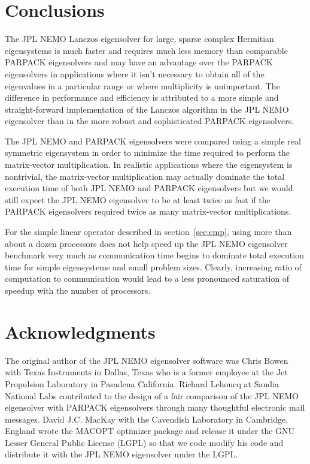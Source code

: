 \documentclass[twoside,12pt]{article}
\begin{document}
\section{Conclusions}
The JPL NEMO Lanczos eigensolver
for large, sparse complex Hermitian eigensystems
is much faster and requires much less memory
than comparable PARPACK eigensolvers
and may have an advantage over the PARPACK eigensolvers
in applications where it isn't necessary to obtain
all of the eigenvalues in a particular range or
where multiplicity is unimportant.
The difference in performance and efficiency
is attributed to a more simple and straight-forward implementation
of the Lanczos algorithm in the JPL NEMO eigensolver
than in the more robust and sophisticated PARPACK eigensolvers.

The JPL NEMO and PARPACK eigensolvers were compared using
a simple real symmetric eigensystem in order to minimize
the time required to perform the matrix-vector multiplication.
In realistic applications where the eigensystem is nontrivial,
the matrix-vector multiplication may actually dominate
the total execution time of both JPL NEMO and PARPACK eigensolvers
but we would still expect the JPL NEMO eigensolver
to be at least twice as fast if the PARPACK eigensolvers required
twice as many matrix-vector multiplications.

For the simple linear operator described in section~\ref{sec:cmp},
using more than about a dozen processors does not help speed up
the JPL NEMO eigensolver benchmark very much
as communication time begins to dominate total execution time
for simple eigensystems and small problem sizes.
Clearly, increasing ratio of computation to communication
would lead to a less pronounced saturation of speedup
with the number of processors.


\section{Acknowledgments}
The original author of the JPL NEMO eigensolver software
was Chris Bowen with Texas Instruments in Dallas, Texas
who is a former employee at the Jet Propulsion Laboratory
in Pasadena California.
Richard Lehoucq at Sandia National Labs contributed
to the design of a fair comparison of the JPL NEMO eigensolver
with PARPACK eigensolvers
through many thoughtful electronic mail messages.
David J.C. MacKay with the Cavendish Laboratory in Cambridge, England
 wrote the MACOPT optimizer package
and release it under the GNU Lesser General Public License (LGPL)
so that we code modify his code and distribute it
with the JPL NEMO eigensolver under the LGPL.
\end{document}
